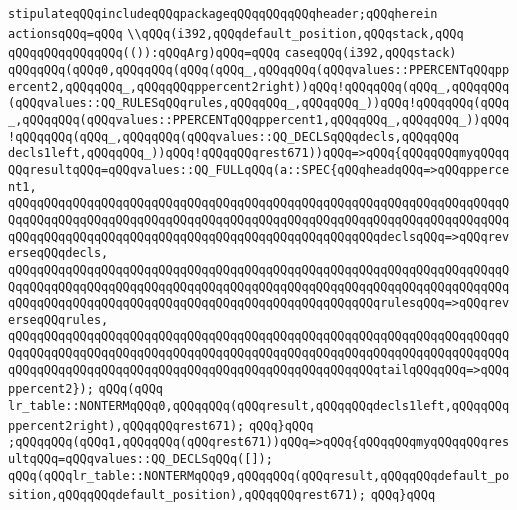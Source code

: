 \verb|stipulateqQQqincludeqQQqpackageqQQqqQQqqQQqheader;qQQqherein|\newline
\verb|actionsqQQq=qQQq|\newline
\verb|\\qQQq(i392,qQQqdefault_position,qQQqstack,qQQq|\newline
\verb|qQQqqQQqqQQqqQQq(()):qQQqArg)qQQq=qQQq|\newline
\verb|caseqQQq(i392,qQQqstack)|\newline
\verb|qQQqqQQq(qQQq0,qQQqqQQq(qQQq(qQQq_,qQQqqQQq(qQQqvalues::PPERCENTqQQqppercent2,qQQqqQQq_,qQQqqQQqppercent2right))qQQq!qQQqqQQq(qQQq_,qQQqqQQq(qQQqvalues::QQ_RULESqQQqrules,qQQqqQQq_,qQQqqQQq_))qQQq!qQQqqQQq(qQQq_,qQQqqQQq(qQQqvalues::PPERCENTqQQqppercent1,qQQqqQQq_,qQQqqQQq_))qQQq!qQQqqQQq(qQQq_,qQQqqQQq(qQQqvalues::QQ_DECLSqQQqdecls,qQQqqQQq|\newline
\verb|decls1left,qQQqqQQq_))qQQq!qQQqqQQqrest671))qQQq=>qQQq{qQQqqQQqmyqQQqqQQqresultqQQq=qQQqvalues::QQ_FULLqQQq(a::SPEC{qQQqheadqQQq=>qQQqppercent1,|\newline
\verb|qQQqqQQqqQQqqQQqqQQqqQQqqQQqqQQqqQQqqQQqqQQqqQQqqQQqqQQqqQQqqQQqqQQqqQQqqQQqqQQqqQQqqQQqqQQqqQQqqQQqqQQqqQQqqQQqqQQqqQQqqQQqqQQqqQQqqQQqqQQqqQQqqQQqqQQqqQQqqQQqqQQqqQQqqQQqqQQqqQQqqQQqqQQqqQQqdeclsqQQq=>qQQqreverseqQQqdecls,|\newline
\verb|qQQqqQQqqQQqqQQqqQQqqQQqqQQqqQQqqQQqqQQqqQQqqQQqqQQqqQQqqQQqqQQqqQQqqQQqqQQqqQQqqQQqqQQqqQQqqQQqqQQqqQQqqQQqqQQqqQQqqQQqqQQqqQQqqQQqqQQqqQQqqQQqqQQqqQQqqQQqqQQqqQQqqQQqqQQqqQQqqQQqqQQqqQQqqQQqrulesqQQq=>qQQqreverseqQQqrules,|\newline
\verb|qQQqqQQqqQQqqQQqqQQqqQQqqQQqqQQqqQQqqQQqqQQqqQQqqQQqqQQqqQQqqQQqqQQqqQQqqQQqqQQqqQQqqQQqqQQqqQQqqQQqqQQqqQQqqQQqqQQqqQQqqQQqqQQqqQQqqQQqqQQqqQQqqQQqqQQqqQQqqQQqqQQqqQQqqQQqqQQqqQQqqQQqqQQqqQQqtailqQQqqQQq=>qQQqppercent2});|\newline
\verb|qQQq(qQQq|\newline
\verb|lr_table::NONTERMqQQq0,qQQqqQQq(qQQqresult,qQQqqQQqdecls1left,qQQqqQQqppercent2right),qQQqqQQqrest671);|\newline
\verb|qQQq}qQQq|\newline
\verb|;qQQqqQQq(qQQq1,qQQqqQQq(qQQqrest671))qQQq=>qQQq{qQQqqQQqmyqQQqqQQqresultqQQq=qQQqvalues::QQ_DECLSqQQq([]);|\newline
\verb|qQQq(qQQqlr_table::NONTERMqQQq9,qQQqqQQq(qQQqresult,qQQqqQQqdefault_position,qQQqqQQqdefault_position),qQQqqQQqrest671);|\newline
\verb|qQQq}qQQq|\newline
